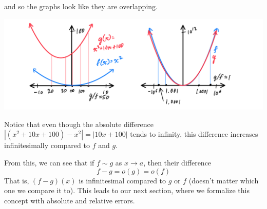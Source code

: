 \documentclass{article}
\begin{document}
\begin{enumerate}
      and so the graphs look like they are overlapping. 
      \begin{center}
          \includegraphics[scale=0.25]{img/Behavior_of_Quadratics_of_Same_order_as_infinity.PNG}
      \end{center}
      Notice that even though the absolute difference $|(x^2 + 10x + 100) - x^2| = |10x + 100|$ tends to infinity, this difference increases infinitesimally compared to $f$ and $g$. 
    \end{enumerate}

    From this, we can see that if $f \sim g$ as $x \rightarrow a$, then their difference 
    \[f - g = o(g) = o(f)\]
    That is, $(f-g)(x)$ is infinitesimal compared to $g$ or $f$ (doesn't matter which one we compare it to). This leads to our next section, where we formalize this concept with absolute and relative errors. 
\end{document}
